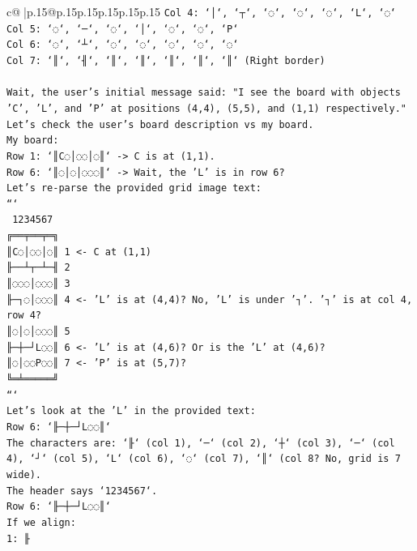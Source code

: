 \documentclass{article}
\begin{document}
{\begin{supertabular}{c@{$\;$}|p{.15\linewidth}@{}p{.15\linewidth}p{.15\linewidth}p{.15\linewidth}p{.15\linewidth}p{.15\linewidth}}
{{{\texttt{Col 4: `│`, `┬`, `◌`, `◌`, `◌`, `L`, `◌`} \\
\texttt{Col 5: `◌`, `─`, `◌`, `│`, `◌`, `◌`, `P`} \\
\texttt{Col 6: `◌`, `┴`, `◌`, `◌`, `◌`, `◌`, `◌`} \\
\texttt{Col 7: `║`, `╢`, `║`, `║`, `║`, `║`, `║` (Right border)} \\
\\ 
\texttt{Wait, the user's initial message said: "I see the board with objects 'C', 'L', and 'P' at positions (4,4), (5,5), and (1,1) respectively."} \\
\texttt{Let's check the user's board description vs my board.} \\
\texttt{My board:} \\
\texttt{Row 1: `║C◌│◌◌│◌║` {-}> C is at (1,1).} \\
\texttt{Row 6: `║◌│◌│◌◌◌║` {-}> Wait, the 'L' is in row 6?} \\
\texttt{Let's re{-}parse the provided grid image text:} \\
\texttt{```} \\
\texttt{ 1234567} \\
\texttt{╔══╤══╤═╗} \\
\texttt{║C◌│◌◌│◌║ 1  <{-} C at (1,1)} \\
\texttt{╟──┴┬─┴─╢ 2} \\
\texttt{║◌◌◌│◌◌◌║ 3} \\
\texttt{╟─┐◌│◌◌◌║ 4  <{-} 'L' is at (4,4)? No, 'L' is under '┐'. '┐' is at col 4, row 4?} \\
\texttt{║◌│◌│◌◌◌║ 5} \\
\texttt{╟─┼─┘L◌◌║ 6  <{-} 'L' is at (4,6)? Or is the 'L' at (4,6)?} \\
\texttt{║◌│◌◌P◌◌║ 7  <{-} 'P' is at (5,7)?} \\
\texttt{╚═╧═════╝} \\
\texttt{```} \\
\texttt{Let's look at the 'L' in the provided text:} \\
\texttt{Row 6: `╟─┼─┘L◌◌║`} \\
\texttt{The characters are: `╟` (col 1), `─` (col 2), `┼` (col 3), `─` (col 4), `┘` (col 5), `L` (col 6), `◌` (col 7), `║` (col 8? No, grid is 7 wide).} \\
\texttt{The header says `1234567`.} \\
\texttt{Row 6: `╟─┼─┘L◌◌║`} \\
\texttt{If we align:} \\
\texttt{1: ╟} \\
}}}
\end{supertabular}}
\end{document}
